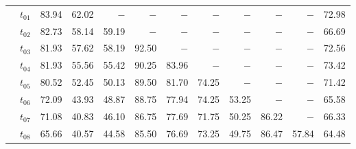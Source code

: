 \begin{table}[ht]
\begin{tabular}{@{}l l r r r r r r r r r r@{}}
 & $t_{01}$ & 83.94 & 62.02 & $-$ & $-$ & $-$ & $-$ & $-$ & $-$ & $-$ & 72.98 \\
 & $t_{02}$ & 82.73 & 58.14 & 59.19 & $-$ & $-$ & $-$ & $-$ & $-$ & $-$ & 66.69 \\
 & $t_{03}$ & 81.93 & 57.62 & 58.19 & 92.50 & $-$ & $-$ & $-$ & $-$ & $-$ & 72.56 \\
 & $t_{04}$ & 81.93 & 55.56 & 55.42 & 90.25 & 83.96 & $-$ & $-$ & $-$ & $-$ & 73.42 \\
 & $t_{05}$ & 80.52 & 52.45 & 50.13 & 89.50 & 81.70 & 74.25 & $-$ & $-$ & $-$ & 71.42 \\
 & $t_{06}$ & 72.09 & 43.93 & 48.87 & 88.75 & 77.94 & 74.25 & 53.25 & $-$ & $-$ & 65.58 \\
 & $t_{07}$ & 71.08 & 40.83 & 46.10 & 86.75 & 77.69 & 71.75 & 50.25 & 86.22 & $-$ & 66.33 \\
 & $t_{08}$ & 65.66 & 40.57 & 44.58 & 85.50 & 76.69 & 73.25 & 49.75 & 86.47 & 57.84 & 64.48 \\
\bottomrule
\end{tabular}
\end{table}

